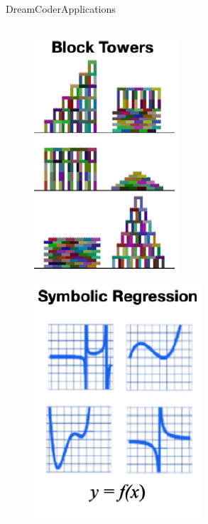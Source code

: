 \documentclass[AERbeamer%
              ,optEnglish%
              ,optBiber%
              ,optBibstyleAlphabetic%
              ,optBeamerClassicFormat%
              ]{AERlatex}%
\begin{document}
\begin{frame}[c]{DreamCoder}{Applications}
\begin{columns}[T]
\begin{column}{0.33\textwidth}
            \begin{figure}
                \centering
                \includegraphics[height=0.35\textheight]{DreamCoderApp5.png}
            \end{figure}
            \begin{figure}
                \centering
                \includegraphics[height=0.35\textheight]{DreamCoderApp6.png}
            \end{figure}
        \end{column}
        \begin{column}{0.33\textwidth}
            \begin{figure}
                \centering

\end{figure}
\end{column}
\end{columns}
\end{frame}
\end{document}
